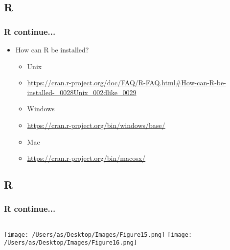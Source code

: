 \documentclass[11pt]{beamer}
\begin{document}
\subsection{R}
\begin{frame}
\frametitle{{\sf R} continue...}
\begin{itemize}
\item How can  {\sf R} be installed?
\vspace{0.1in}
\begin{itemize}
\item Unix
\item  \url{https://cran.r-project.org/doc/FAQ/R-FAQ.html\#How-can-R-be-installed-\_0028Unix\_002dlike\_0029}
\vspace{0.2in}
\item Windows 
\item \url{https://cran.r-project.org/bin/windows/base/}
\vspace{0.2in}
\item Mac 
\item \url{https://cran.r-project.org/bin/macosx/}
\end{itemize}
\end{itemize}
\end{frame}


\subsection{R}
\begin{frame}
\frametitle{{\sf R} continue...}
\begin{center}
\begin{columns}[t]
        \texttt{[image: /Users/as/Desktop/Images/Figure15.png]}
        \texttt{[image: /Users/as/Desktop/Images/Figure16.png]}
    \end{columns} 
\end{center}
\end{frame}
\end{document}
